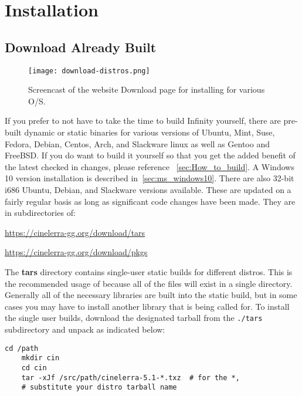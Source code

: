 \chapter{Installation}
\label{cha:Installation}

\section{Download Already Built \CGG{}}%
\label{sec:download_already_built_cinelerra_gg}

\begin{figure}[htpb]
	\centering
	\texttt{[image: download-distros.png]}
	\caption{Screencast of the website Download page for installing \CGG{} for various O/S.}
	\label{fig:download-distros}
\end{figure}

If you prefer to not have to take the time to build \CGG{} Infinity
yourself, there are pre-built dynamic or static binaries for various
versions of Ubuntu, Mint, Suse, Fedora, Debian, Centos, Arch, and
Slackware linux as well as Gentoo and FreeBSD.  If you do want to build it yourself so that
you get the added benefit of the latest checked in changes, please reference
~\ref{sec:How_to_build}.
%
A Windows 10 version installation is described in~\ref{sec:ms_windows10}.  There are also 32-bit i686 Ubuntu, Debian,
and Slackware versions available.  These are updated on a fairly
regular basis as long as significant code changes have been made.
They are in subdirectories of:

\begin{list}{}{}
	\item \href{https://cinelerra-gg.org/download/tars}{https://cinelerra-gg.org/download/tars}
	\item \href{https://cinelerra-gg.org/download/pkgs}{https://cinelerra-gg.org/download/pkgs}
\end{list}

The \textbf{tars} directory contains single-user static builds for
different distros.
%
This is the recommended usage of \CGG{} because all of the files
will exist in a single directory.  Generally all of the necessary
libraries are built into the static build, but in some cases you may
have to install another library that is being called for.
%
To install the single user builds, download the designated tarball
from the \texttt{./tars} subdirectory and unpack as indicated below:

\begin{lstlisting}[style=sh]
	cd /path
	mkdir cin
	cd cin
	tar -xJf /src/path/cinelerra-5.1-*.txz  # for the *,
	# substitute your distro tarball name
\end{lstlisting}

